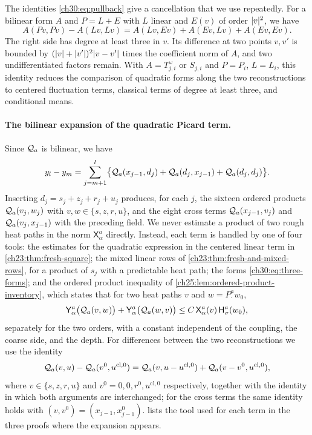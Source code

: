 The identities \eqref{ch30:eq:pullback} give a cancellation that we use repeatedly. For a bilinear form $A$ and $P=L+E$ with $L$ linear and $E(v)$ of order $\lvert v\rvert^2$, we have
\begin{equation}\label{ch30:eq:cubic-identity}
 A(Pv,Pv)-A(Lv,Lv)=A(Lv,Ev)+A(Ev,Lv)+A(Ev,Ev).
\end{equation}
The right side has degree at least three in $v$. Its difference at two points $v,v'$ is bounded by $(\lvert v\rvert+\lvert v'\rvert)^2\lvert v-v'\rvert$ times the coefficient norm of $A$, and two undifferentiated factors remain. With $A=T^\omega_{j,i}$ or $S_{j,i}$ and $P=P_i$, $L=L_i$, this identity reduces the comparison of quadratic forms along the two reconstructions to centered fluctuation terms, classical terms of degree at least three, and conditional means.

\paragraph{The bilinear expansion of the quadratic Picard term.} Since $\mathcal Q_{a}$ is bilinear, we have
\begin{equation}\label{ch30:eq:bilinear-expansion}
 y_l-y_m=\sum_{j=m+1}^l\bigl\{\mathcal Q_{a}(x_{j-1},d_j)+\mathcal Q_{a}(d_j,x_{j-1})+\mathcal Q_{a}(d_j,d_j)\bigr\}.
\end{equation}
Inserting $d_j=s_j+z_j+r_j+u_j$ produces, for each $j$, the sixteen ordered products $\mathcal Q_{a}(v_j,w_j)$ with $v,w\in\{s,z,r,u\}$, and the eight cross terms $\mathcal Q_{a}(x_{j-1},v_j)$ and $\mathcal Q_{a}(v_j,x_{j-1})$ with the preceding field. We never estimate a product of two rough heat paths in the norm $\mathsf X_\alpha^a$ directly. Instead, each term is handled by one of four tools: the estimates for the quadratic expression in the centered linear term in \cref{ch23:thm:fresh-square}; the mixed linear rows of \cref{ch23:thm:fresh-and-mixed-rows}, for a product of $s_j$ with a predictable heat path; the forms \eqref{ch30:eq:three-forms}; and the ordered product inequality of \cref{ch25:lem:ordered-product-inventory}, which states that for two heat paths $v$ and $w=P_\cdot^aw_0$,
\begin{equation}\label{ch30:eq:ordered-product}
 \mathsf Y_\alpha^a\bigl(\mathcal Q_{a}(v,w)\bigr)+\mathsf Y_\alpha^a\bigl(\mathcal Q_{a}(w,v)\bigr)\le C\,\mathsf X_\alpha^a(v)\,\mathsf H_\sigma^a(w_0),
\end{equation}
separately for the two orders, with a constant independent of the coupling, the coarse side, and the depth. For differences between the two reconstructions we use the identity
\begin{equation}\label{ch30:eq:polarization}
 \mathcal Q_{a}(v,u)-\mathcal Q_{a}(v^0,u^{\mathrm{cl},0})=\mathcal Q_{a}(v,u-u^{\mathrm{cl},0})+\mathcal Q_{a}(v-v^0,u^{\mathrm{cl},0}),
\end{equation}
where $v\in\{s,z,r,u\}$ and $v^0=0,0,r^0,u^{\mathrm{cl},0}$ respectively, together with the identity in which both arguments are interchanged; for the cross terms the same identity holds with $(v,v^0)=(x_{j-1},x_{j-1}^0)$.  lists the tool used for each term in the three proofs where the expansion appears.

